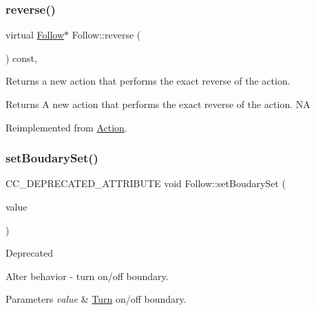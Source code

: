 \subsubsection{\texorpdfstring{reverse()}{reverse()}\hspace{0.1cm}{\footnotesize\ttfamily [2/2]}}
{\footnotesize\ttfamily virtual \hyperlink{classFollow}{Follow}$\ast$ Follow\+::reverse (\begin{DoxyParamCaption}\item[{void}]{ }\end{DoxyParamCaption}) const\hspace{0.3cm}{\ttfamily [override]}, {\ttfamily [virtual]}}

Returns a new action that performs the exact reverse of the action.

\begin{DoxyReturn}{Returns}
A new action that performs the exact reverse of the action.  NA 
\end{DoxyReturn}


Reimplemented from \hyperlink{classAction_a2f06b574c4f066a3f11854a77c456227}{Action}.

\mbox{\label{classFollow_a509872f55b024bef0b5e4b8f4ca54692}} 
\subsubsection{\texorpdfstring{set\+Boudary\+Set()}{setBoudarySet()}\hspace{0.1cm}{\footnotesize\ttfamily [1/2]}}
{\footnotesize\ttfamily C\+C\+\_\+\+D\+E\+P\+R\+E\+C\+A\+T\+E\+D\+\_\+\+A\+T\+T\+R\+I\+B\+U\+TE void Follow\+::set\+Boudary\+Set (\begin{DoxyParamCaption}\item[{bool}]{value }\end{DoxyParamCaption})\hspace{0.3cm}{\ttfamily [inline]}}

\begin{DoxyRefDesc}{Deprecated}
\item[\hyperlink{deprecated__deprecated000006}{Deprecated}]Alter behavior -\/ turn on/off boundary. \end{DoxyRefDesc}



\begin{DoxyParams}{Parameters}
{\em value} & \hyperlink{classTurn}{Turn} on/off boundary. \\
\hline
\end{DoxyParams}
\mbox{\label{classFollow_a509872f55b024bef0b5e4b8f4ca54692}} 
